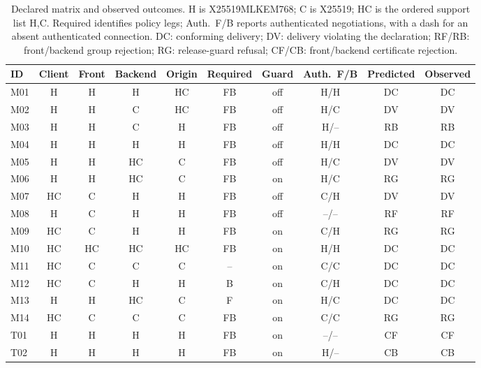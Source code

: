 \begin{table}[t]\centering\small
\caption{Declared matrix and observed outcomes. H is X25519MLKEM768; C is X25519; HC is the ordered support list H,C. Required identifies policy legs; Auth.\ F/B reports authenticated negotiations, with a dash for an absent authenticated connection. DC: conforming delivery; DV: delivery violating the declaration; RF/RB: front/backend group rejection; RG: release-guard refusal; CF/CB: front/backend certificate rejection.}
\label{tab:matrix}
\begin{tabular}{@{}lccccccccc@{}}\toprule
ID & Client & Front & Backend & Origin & Required & Guard & Auth.\ F/B & Predicted & Observed \\ \midrule
M01 & H & H & H & HC & FB & off & H/H & DC & DC \\
M02 & H & H & C & HC & FB & off & H/C & DV & DV \\
M03 & H & H & C & H & FB & off & H/-- & RB & RB \\
M04 & H & H & H & H & FB & off & H/H & DC & DC \\
M05 & H & H & HC & C & FB & off & H/C & DV & DV \\
M06 & H & H & HC & C & FB & on & H/C & RG & RG \\
M07 & HC & C & H & H & FB & off & C/H & DV & DV \\
M08 & H & C & H & H & FB & off & --/-- & RF & RF \\
M09 & HC & C & H & H & FB & on & C/H & RG & RG \\
M10 & HC & HC & HC & HC & FB & on & H/H & DC & DC \\
M11 & HC & C & C & C & -- & on & C/C & DC & DC \\
M12 & HC & C & H & H & B & on & C/H & DC & DC \\
M13 & H & H & HC & C & F & on & H/C & DC & DC \\
M14 & HC & C & C & C & FB & on & C/C & RG & RG \\
T01 & H & H & H & H & FB & on & --/-- & CF & CF \\
T02 & H & H & H & H & FB & on & H/-- & CB & CB \\
\bottomrule\end{tabular}
\end{table}
